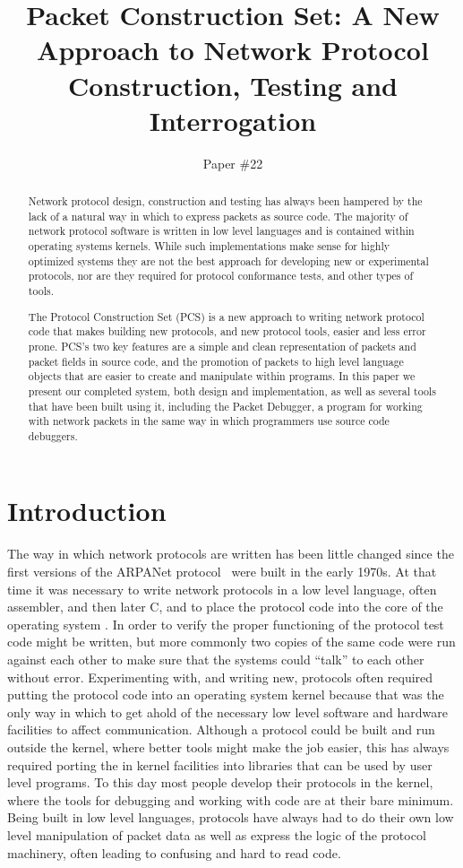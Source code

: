 \documentclass{sig-alternate-10pt}
\title{Packet Construction Set: A New Approach to Network Protocol
  Construction, Testing and Interrogation}
\author{Paper \#22}
\begin{document}
\maketitle
\begin{abstract}
Network protocol design, construction and testing has always been
hampered by the lack of a natural way in which to express packets as
source code.  The majority of network protocol software is written in
low level languages and is contained within operating systems
kernels.  While such implementations make sense for highly optimized
systems they are not the best approach for developing new or
experimental protocols, nor are they required for protocol conformance
tests, and other types of tools.

The Protocol Construction Set (PCS) is a new approach to writing
network protocol code that makes building new protocols, and new
protocol tools, easier and less error prone.  PCS's two key features
are a simple and clean representation of packets and packet fields in
source code, and the promotion of packets to high level language
objects that are easier to create and manipulate within programs.  In
this paper we present our completed system, both design and
implementation, as well as several tools that have been built using
it, including the Packet Debugger, a program for working with network
packets in the same way in which programmers use source code
debuggers.

\end{abstract}

\section{Introduction}

The way in which network protocols are written has been little changed
since the first versions of the ARPANet protocol~\cite{ietf:rfc46}
were built in the early 1970s.  At that time it was necessary to write
network protocols in a low level language, often assembler, and then
later C, and to place the protocol code into the core of the operating
system \cite{mckusick:fbsd}.  In order to verify the proper
functioning of the protocol test code might be written, but more
commonly two copies of the same code were run against each other to
make sure that the systems could ``talk'' to each other without error.
Experimenting with, and writing new, protocols often required putting
the protocol code into an operating system kernel because that was the
only way in which to get ahold of the necessary low level software and
hardware facilities to affect communication.  Although a protocol
could be built and run outside the kernel, where better tools might
make the job easier, this has always required porting the in kernel
facilities into libraries that can be used by user level programs.  To
this day most people develop their protocols in the kernel, where the
tools for debugging and working with code are at their bare minimum.
Being built in low level languages, protocols have always had to do
their own low level manipulation of packet data as well as express the
logic of the protocol machinery, often leading to confusing and hard
to read code.
\end{document}
